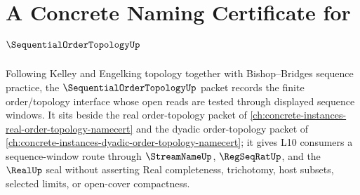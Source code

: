 \chapter{A Concrete Naming Certificate for $\SequentialOrderTopologyUp$}
\label{ch:concrete-instances-sequential-order-topology-namecert}

Following Kelley and Engelking topology together with Bishop--Bridges sequence practice, the $\SequentialOrderTopologyUp$ packet records the finite order/topology interface whose open reads are tested through displayed sequence windows. It sits beside the real order-topology packet of \autoref{ch:concrete-instances-real-order-topology-namecert} and the dyadic order-topology packet of \autoref{ch:concrete-instances-dyadic-order-topology-namecert}; it gives L10 consumers a sequence-window route through $\StreamNameUp$, $\RegSeqRatUp$, and the $\RealUp$ seal without asserting Real completeness, trichotomy, host subsets, selected limits, or open-cover compactness.

